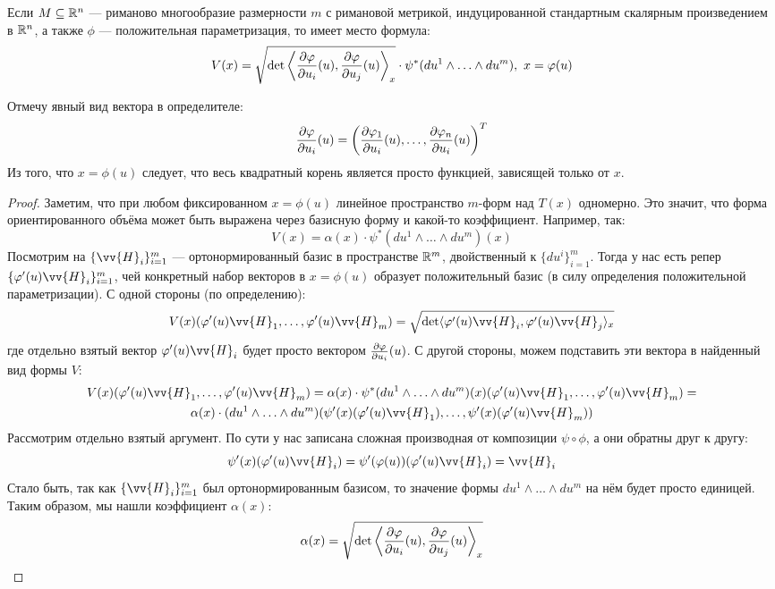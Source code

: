 \begin{proposition}
	Если $M \subseteq \mathbb{R}^n$ --- риманово многообразие размерности $m$ с римановой метрикой, индуцированной стандартным скалярным произведением в $\mathbb{R}^n$, а также $\phi$ --- положительная параметризация, то имеет место формула:
	\[
		V(x) = \sqrt{\det\left\langle\frac{\partial \varphi}{\partial u_i}(u), \frac{\partial \varphi}{\partial u_j}(u)\right\rangle_x} \cdot \psi^*(du^1 \wedge \ldots \wedge du^m),\ x = \varphi(u)
	\]
\end{proposition}

\begin{anote}
	Отмечу явный вид вектора в определителе:
	\[
		\frac{\partial \varphi}{\partial u_i}(u) = \left(\frac{\partial \varphi_1}{\partial u_i}(u), \ldots, \frac{\partial \varphi_n}{\partial u_i}(u)\right)^T
	\]
	Из того, что $x = \phi(u)$ следует, что весь квадратный корень является просто функцией, зависящей только от $x$.
\end{anote}

\begin{proof}
	Заметим, что при любом фиксированном $x = \phi(u)$ линейное пространство $m$-форм над $T(x)$ одномерно. Это значит, что форма ориентированного объёма может быть выражена через базисную форму и какой-то коэффициент. Например, так:
	\[
		V(x) = \alpha(x) \cdot \psi^*(du^1 \wedge \ldots \wedge du^m)(x)
	\]
	Посмотрим на $\{\vv{H}_i\}_{i = 1}^m$ --- ортонормированный базис в пространстве $\mathbb{R}^m$, двойственный к $\{du^i\}_{i = 1}^m$. Тогда у нас есть репер $\{\phi'(u)\vv{H}_i\}_{i = 1}^m$, чей конкретный набор векторов в $x = \phi(u)$ образует положительный базис (в силу определения положительной параметризации). С одной стороны (по определению):
	\[
		V(x)(\phi'(u)\vv{H}_1, \ldots, \phi'(u)\vv{H}_m) = \sqrt{\det\ntbr{\phi'(u)\vv{H}_i, \phi'(u)\vv{H}_j}_x}
	\]
	где отдельно взятый вектор $\phi'(u)\vv{H}_i$ будет просто вектором $\frac{\partial \varphi}{\partial u_i}(u)$. С другой стороны, можем подставить эти вектора в найденный вид формы $V$:
	\begin{multline*}
		V(x)(\phi'(u)\vv{H}_1, \ldots, \phi'(u)\vv{H}_m) = \alpha(x) \cdot \psi^*(du^1 \wedge \ldots \wedge du^m)(x)(\phi'(u)\vv{H}_1, \ldots, \phi'(u)\vv{H}_m) =
		\\
		\alpha(x) \cdot (du^1 \wedge \ldots \wedge du^m)(\psi'(x)(\phi'(u)\vv{H}_1), \ldots, \psi'(x)(\phi'(u)\vv{H}_m))
	\end{multline*}
	Рассмотрим отдельно взятый аргумент. По сути у нас записана сложная производная от композиции $\psi \circ \phi$, а они обратны друг к другу:
	\[
		\psi'(x)(\phi'(u)\vv{H}_i) = \psi'(\phi(u))(\phi'(u)\vv{H}_i) = \vv{H}_i
	\]
	Стало быть, так как $\{\vv{H}_i\}_{i = 1}^m$ был ортонормированным базисом, то значение формы $du^1 \wedge \ldots \wedge du^m$ на нём будет просто единицей. Таким образом, мы нашли коэффициент $\alpha(x)$:
	\[
		\alpha(x) = \sqrt{\det\left\langle\frac{\partial \varphi}{\partial u_i}(u), \frac{\partial \varphi}{\partial u_j}(u)\right\rangle_x}
	\]
\end{proof}

